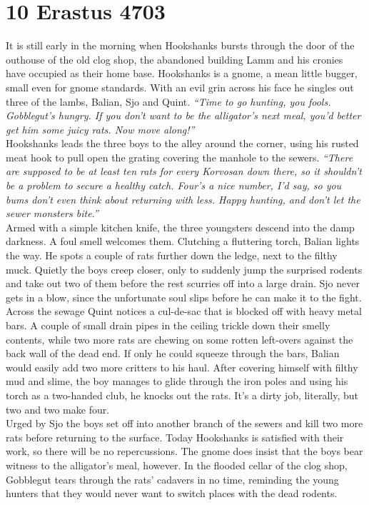 \section{10 Erastus 4703}

It is still early in the morning when Hookshanks bursts through the door of the outhouse of the old clog shop, the abandoned building Lamm and his cronies have occupied as their home base. Hookshanks is a gnome, a mean little bugger, small even for gnome standards. With an evil grin across his face he singles out three of the lambs, Balian, Sjo and Quint. {\itshape ``Time to go hunting, you fools. Gobblegut's hungry. If you don't want to be the alligator's next meal, you'd better get him some juicy rats. Now move along!''}\\

Hookshanks leads the three boys to the alley around the corner, using his rusted meat hook to pull open the grating covering the manhole to the sewers. {\itshape ``There are supposed to be at least ten rats for every Korvosan down there, so it shouldn't be a problem to secure a healthy catch. Four's a nice number, I'd say, so you bums don't even think about returning with less. Happy hunting, and don't let the sewer monsters bite.''}\\

Armed with a simple kitchen knife, the three youngsters descend into the damp darkness. A foul smell welcomes them. Clutching a fluttering torch, Balian lights the way. He spots a couple of rats further down the ledge, next to the filthy muck. Quietly the boys creep closer, only to suddenly jump the surprised rodents and take out two of them before the rest scurries off into a large drain. Sjo never gets in a blow, since the unfortunate soul slips before he can make it to the fight.\\

Across the sewage Quint notices a cul-de-sac that is blocked off with heavy metal bars. A couple of small drain pipes in the ceiling trickle down their smelly contents, while two more rats are chewing on some rotten left-overs against the back wall of the dead end. If only he could squeeze through the bars, Balian would easily add two more critters to his haul. After covering himself with filthy mud and slime, the boy manages to glide through the iron poles and using his torch as a two-handed club, he knocks out the rats. It's a dirty job, literally, but two and two make four.\\

Urged by Sjo the boys set off into another branch of the sewers and kill two more rats before returning to the surface. Today Hookshanks is satisfied with their work, so there will be no repercussions. The gnome does insist that the boys bear witness to the alligator's meal, however. In the flooded cellar of the clog shop, Gobblegut tears through the rats' cadavers in no time, reminding the young hunters that they would never want to switch places with the dead rodents.\\

